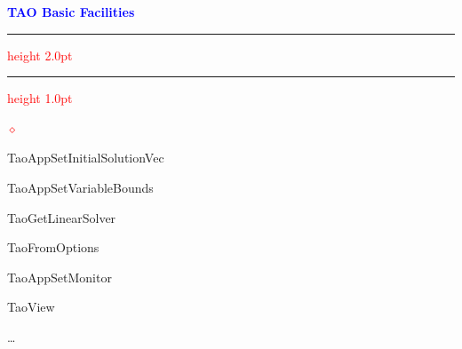 \documentclass{seminar}
\newcommand{\reddiamond}{\textcolor{red}{$\diamond$}}
\newcommand{\redstripe}{\textcolor{red}{\hrule height 2.0pt\hfil}
             \vspace{-1.8pt}
             \textcolor{red}{\hrule height 1.0pt\hfil}
}
\newcommand{\heading}[1]{%
   \centerline{\textcolor{blue}{\textbf{#1}}}%
    \redstripe%
    \bigskip
}
\begin{document}
\begin{slide}

\heading{TAO Basic Facilities}

\begin{list}{\reddiamond}{}
\item
TaoAppSetInitialSolutionVec
\item
TaoAppSetVariableBounds
\item
TaoGetLinearSolver
\item 
TaoFromOptions
\item
TaoAppSetMonitor
\item
TaoView
\item
\ldots
\end{list}

\vfill

\end{slide}

% 
% 
% 
% 
\end{document}
